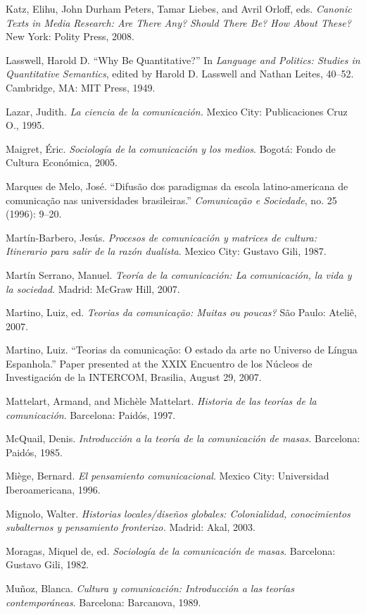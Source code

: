 \documentclass{tufte-handout}
\begin{document}
\begin{hangparas}{.25in}{1}
Katz, Elihu, John Durham Peters, Tamar Liebes, and Avril Orloff, eds.
\emph{Canonic Texts in Media Research: Are There Any? Should There Be?
How About These?} New York: Polity Press, 2008.

Lasswell, Harold D. ``Why Be Quantitative?'' In \emph{Language and
Politics: Studies in Quantitative Semantics}, edited by Harold D.
Lasswell and Nathan Leites, 40--52. Cambridge, MA: MIT Press, 1949.

Lazar, Judith. \emph{La ciencia de la comunicación.} Mexico City:
Publicaciones Cruz O., 1995.

Maigret, Éric. \emph{Sociología de la comunicación y los medios}.
Bogotá: Fondo de Cultura Económica, 2005.

Marques de Melo, José. ``Difusão dos paradigmas da escola
latino-americana de comunicação nas universidades brasileiras.''
\emph{Comunicação e Sociedade}, no. 25 (1996): 9--20.

Martín-Barbero, Jesús. \emph{Procesos de comunicación y matrices de
cultura: Itinerario para salir de la razón dualista}. Mexico City:
Gustavo Gili, 1987.

Martín Serrano, Manuel. \emph{Teoría de la comunicación: La
comunicación, la vida y la sociedad.} Madrid: McGraw Hill, 2007.

Martino, Luiz, ed. \emph{Teorias da comunicação: Muitas ou poucas?} São
Paulo: Ateliê, 2007.

Martino, Luiz. ``Teorias da comunicação: O estado da arte no Universo de
Língua Espanhola.'' Paper presented at the XXIX Encuentro de los Núcleos
de Investigación de la INTERCOM, Brasilia, August 29, 2007.

Mattelart, Armand, and Michèle Mattelart. \emph{Historia de las teorías
de la comunicación}. Barcelona: Paidós, 1997.

McQuail, Denis. \emph{Introducción a la teoría de la comunicación de
masas.} Barcelona: Paidós, 1985.

Miège, Bernard. \emph{El pensamiento comunicacional}. Mexico City:
Universidad Iberoamericana, 1996.

Mignolo, Walter. \emph{Historias locales/diseños globales: Colonialidad,
conocimientos subalternos y pensamiento fronterizo.} Madrid: Akal, 2003.

Moragas, Miquel de, ed. \emph{Sociología de la comunicación de masas}.
Barcelona: Gustavo Gili, 1982.

Muñoz, Blanca. \emph{Cultura y comunicación: Introducción a las teorías
contemporáneas}. Barcelona: Barcanova, 1989.


\end{hangparas}
\end{document}
